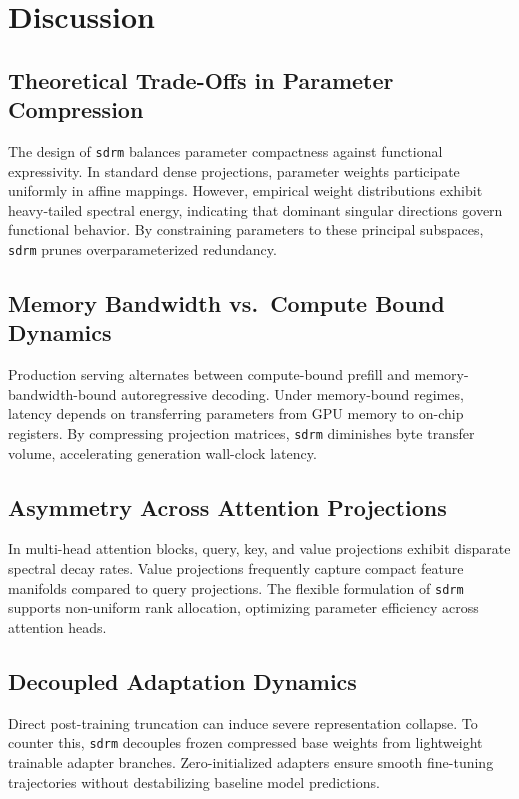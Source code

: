 \section{Discussion}

\subsection{Theoretical Trade-Offs in Parameter Compression}
The design of \texttt{sdrm} balances parameter compactness against functional expressivity. In standard dense projections, parameter weights participate uniformly in affine mappings. However, empirical weight distributions exhibit heavy-tailed spectral energy, indicating that dominant singular directions govern functional behavior. By constraining parameters to these principal subspaces, \texttt{sdrm} prunes overparameterized redundancy.

\subsection{Memory Bandwidth vs.\ Compute Bound Dynamics}
Production serving alternates between compute-bound prefill and memory-bandwidth-bound autoregressive decoding. Under memory-bound regimes, latency depends on transferring parameters from GPU memory to on-chip registers. By compressing projection matrices, \texttt{sdrm} diminishes byte transfer volume, accelerating generation wall-clock latency.

\subsection{Asymmetry Across Attention Projections}
In multi-head attention blocks, query, key, and value projections exhibit disparate spectral decay rates. Value projections frequently capture compact feature manifolds compared to query projections. The flexible formulation of \texttt{sdrm} supports non-uniform rank allocation, optimizing parameter efficiency across attention heads.

\subsection{Decoupled Adaptation Dynamics}
Direct post-training truncation can induce severe representation collapse. To counter this, \texttt{sdrm} decouples frozen compressed base weights from lightweight trainable adapter branches. Zero-initialized adapters ensure smooth fine-tuning trajectories without destabilizing baseline model predictions.

